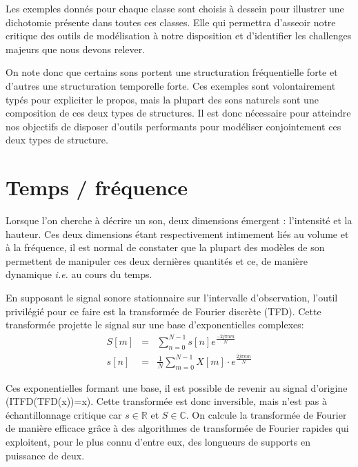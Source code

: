 Les exemples donnés pour chaque classe sont choisis à dessein pour illustrer une dichotomie présente dans toutes ces classes. Elle qui permettra d'asseoir notre critique des outils de modélisation à notre disposition et d'identifier les challenges majeurs que nous devons relever.

On note donc que certains sons portent une structuration fréquentielle forte et d'autres une structuration temporelle forte. Ces exemples sont volontairement typés pour expliciter le propos, mais la plupart des sons naturels sont une composition de ces deux types de structures. Il est donc nécessaire pour atteindre nos objectifs de disposer d'outils performants pour modéliser conjointement ces deux types de structure.

\section{ \nmu Temps / fréquence} \label{sec:tf}

Lorsque l'on cherche à décrire un son, deux dimensions émergent : l'intensité et la hauteur. Ces deux dimensions étant respectivement intimement liés au volume et à la fréquence, il est normal de constater que la plupart des modèles de son permettent de manipuler ces deux dernières quantités et ce, de manière dynamique \textit{i.e.} au cours du temps.

En supposant le signal sonore stationnaire sur l'intervalle d'observation, l'outil privilégié pour ce faire est la transformée de Fourier discrète (TFD). Cette transformée projette le signal sur une base d'exponentielles complexes:
\begin{eqnarray}
  S[m] &=& \sum_{n=0}^{N-1} s[n] e^{\frac{-2j \pi nm}{N}} \\
  s[n] &=& \frac{1}{N} \sum_{m=0}^{N-1} X[m] \cdot e^{\frac{ 2 j \pi m n }{N}}
\end{eqnarray}

Ces exponentielles formant une base, il est possible de revenir au signal d'origine (ITFD(TFD(x))=x). Cette transformée est donc inversible, mais n'est pas à échantillonnage critique car $s\in \mathbb{R}$  et $S \in \mathbb{C}$. On calcule la transformée de Fourier de manière efficace grâce à des algorithmes de transformée de Fourier rapides qui exploitent, pour le plus connu d'entre eux, des longueurs de supports en puissance de deux.

